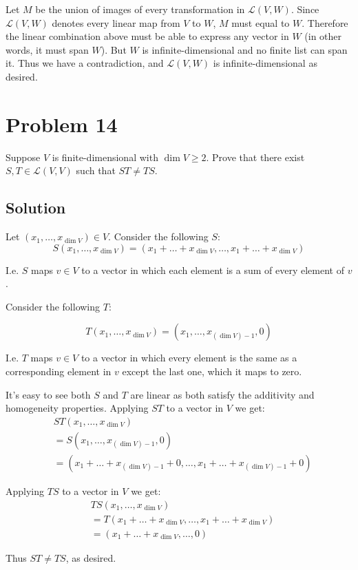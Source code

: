 \documentclass{article}
\begin{document}
\vs

Let $M$ be the union of images of every transformation in $\mathcal{L}(V, W)$. Since $\mathcal{L}(V, W)$ denotes every linear map from $V$ to $W$, $M$ must equal to $W$. Therefore the linear combination above must be able to express any vector in $W$ (in other words, it must span $W$). But $W$ is infinite-dimensional and no finite list can span it. Thus we have a contradiction, and $\mathcal{L}(V, W)$ is infinite-dimensional as desired.

\section*{Problem 14}
Suppose $V$ is finite-dimensional with $\dim V\geq2$. Prove that there exist $S, T\in\mathcal{L}(V, V)$ such that $ST\neq TS$.

\subsection*{Solution}
Let $(x_1,\ldots,x_{\dim V})\in V$. Consider the following $S$:
\[S(x_1,\ldots,x_{\dim V})=(x_1+\ldots+x_{\dim V}, \ldots, x_1+\ldots+x_{\dim V})\]

I.e. $S$ maps $v\in V$ to a vector in which each element is a sum of every element of $v$.

\vs

Consider the following $T$:

\[T(x_1,\ldots,x_{\dim V})=(x_1,\ldots,x_{(\dim V)-1}, 0)\]

I.e. $T$ maps $v\in V$ to a vector in which every element is the same as a corresponding element in $v$ except the last one, which it maps to zero.

\vs

It's easy to see both $S$ and $T$ are linear as both satisfy the additivity and homogeneity properties. Applying $ST$ to a vector in $V$ we get:
\begin{align*}
&ST(x_1,\ldots,x_{\dim V})\\
&=S(x_1,\ldots,x_{(\dim V)-1}, 0)\\
&=(x_1+\ldots+x_{(\dim V)-1}+0, \ldots, x_1+\ldots+x_{(\dim V)-1}+0)    
\end{align*}

Applying $TS$ to a vector in $V$ we get:
\begin{align*}
&TS(x_1,\ldots,x_{\dim V})\\
&=T(x_1+\ldots+x_{\dim V}, \ldots, x_1+\ldots+x_{\dim V})\\
&=(x_1+\ldots+x_{\dim V}, \ldots, 0)
\end{align*}

Thus $ST\neq TS$, as desired.
\end{document}
